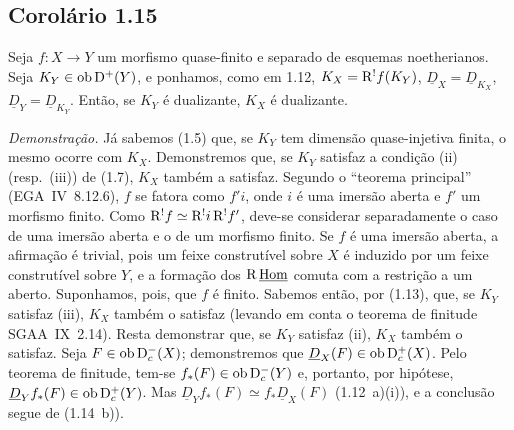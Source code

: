 \subsection*{Corolário 1.15}
Seja $f : X \to Y$ um morfismo quase-finito e separado de esquemas noetherianos. Seja $K_Y \in \operatorname{ob} \mathrm{D}^{+}(Y)$, e ponhamos, como em 1.12, $K_X = \mathrm{R}^{!}f(K_Y)$, $\underline{D}_X = \underline{D}_{K_X}$, $\underline{D}_Y = \underline{D}_{K_Y}$. Então, se $K_Y$ é dualizante, $K_X$ é dualizante.

\emph{Demonstração.} Já sabemos (1.5) que, se $K_Y$ tem dimensão quase-injetiva finita, o mesmo ocorre com $K_X$. Demonstremos que, se $K_Y$ satisfaz a condição (ii) (resp.~(iii)) de (1.7), $K_X$ também a satisfaz. Segundo o \textquotedblleft teorema principal\textquotedblright{} (EGA~IV~8.12.6), $f$ se fatora como $f'i$, onde $i$ é uma imersão aberta e $f'$ um morfismo finito. Como $\mathrm{R}^{!}f \simeq \mathrm{R}^{!}i \, \mathrm{R}^{!}f'$, deve-se considerar separadamente o caso de uma imersão aberta e o de um morfismo finito. Se $f$ é uma imersão aberta, a afirmação é trivial, pois um feixe construtível sobre $X$ é induzido por um feixe construtível sobre $Y$, e a formação dos $\mathrm{R}\,\underline{\operatorname{Hom}}$ comuta com a restrição a um aberto. Suponhamos, pois, que $f$ é finito. Sabemos então, por (1.13), que, se $K_Y$ satisfaz (iii), $K_X$ também o satisfaz (levando em conta o teorema de finitude SGAA~IX~2.14). Resta demonstrar que, se $K_Y$ satisfaz (ii), $K_X$ também o satisfaz. Seja $F \in \operatorname{ob} \mathrm{D}_c^{-}(X)$; demonstremos que $\underline{D}_X(F) \in \operatorname{ob} \mathrm{D}_c^{+}(X)$. Pelo teorema de finitude, tem-se $f_{*}(F) \in \operatorname{ob} \mathrm{D}_c^{-}(Y)$ e, portanto, por hipótese, $\underline{D}_Y f_{*}(F) \in \operatorname{ob} \mathrm{D}_c^{+}(Y)$. Mas $\underline{D}_Y f_{*}(F) \simeq f_{*}\underline{D}_X(F)$ (1.12~a)(i)), e a conclusão segue de (1.14~b)).
